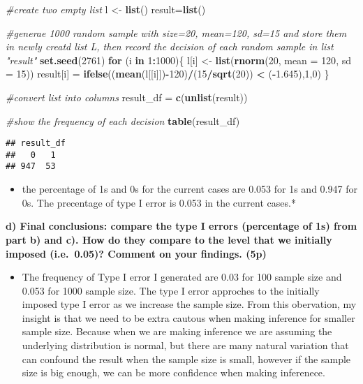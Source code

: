 \documentclass[]{article}
\newenvironment{Shaded}{\begin{snugshade}}{\end{snugshade}}
\newcommand{\CommentTok}[1]{\textcolor[rgb]{0.56,0.35,0.01}{\textit{#1}}}
\newcommand{\ControlFlowTok}[1]{\textcolor[rgb]{0.13,0.29,0.53}{\textbf{#1}}}
\newcommand{\DataTypeTok}[1]{\textcolor[rgb]{0.13,0.29,0.53}{#1}}
\newcommand{\DecValTok}[1]{\textcolor[rgb]{0.00,0.00,0.81}{#1}}
\newcommand{\FloatTok}[1]{\textcolor[rgb]{0.00,0.00,0.81}{#1}}
\newcommand{\KeywordTok}[1]{\textcolor[rgb]{0.13,0.29,0.53}{\textbf{#1}}}
\newcommand{\NormalTok}[1]{#1}
\newcommand{\OperatorTok}[1]{\textcolor[rgb]{0.81,0.36,0.00}{\textbf{#1}}}
\newcommand{\StringTok}[1]{\textcolor[rgb]{0.31,0.60,0.02}{#1}}
\providecommand{\tightlist}{%
  \setlength{\itemsep}{0pt}\setlength{\parskip}{0pt}}
\begin{document}
\begin{Shaded}
\begin{Highlighting}[]
\CommentTok{#create two empty list}
\NormalTok{  l <-}\StringTok{ }\KeywordTok{list}\NormalTok{()}
\NormalTok{result=}\KeywordTok{list}\NormalTok{()}

\CommentTok{#generae 1000 random sample with size=20, mean=120, sd=15 and store them in newly creatd list L, then record the decision of each random sample in list "result"}
\KeywordTok{set.seed}\NormalTok{(}\DecValTok{2761}\NormalTok{)}
\ControlFlowTok{for}\NormalTok{ (i }\ControlFlowTok{in} \DecValTok{1}\OperatorTok{:}\DecValTok{1000}\NormalTok{)\{}
\NormalTok{l[i] <-}\StringTok{ }\KeywordTok{list}\NormalTok{(}\KeywordTok{rnorm}\NormalTok{(}\DecValTok{20}\NormalTok{, }\DataTypeTok{mean =} \DecValTok{120}\NormalTok{, }\DataTypeTok{sd =} \DecValTok{15}\NormalTok{))}
\NormalTok{result[i] =}\StringTok{ }\KeywordTok{ifelse}\NormalTok{((}\KeywordTok{mean}\NormalTok{(l[[i]])}\OperatorTok{-}\DecValTok{120}\NormalTok{)}\OperatorTok{/}\NormalTok{(}\DecValTok{15}\OperatorTok{/}\KeywordTok{sqrt}\NormalTok{(}\DecValTok{20}\NormalTok{)) }\OperatorTok{<}\StringTok{ }\NormalTok{(}\OperatorTok{-}\FloatTok{1.645}\NormalTok{),}\DecValTok{1}\NormalTok{,}\DecValTok{0}\NormalTok{)}
\NormalTok{\}}

\CommentTok{#convert list into columns}
\NormalTok{result_df =}\StringTok{ }\KeywordTok{c}\NormalTok{(}\KeywordTok{unlist}\NormalTok{(result))}

\CommentTok{#show the frequency of each decision}
\KeywordTok{table}\NormalTok{(result_df)}
\end{Highlighting}
\end{Shaded}

\begin{verbatim}
## result_df
##   0   1 
## 947  53
\end{verbatim}

\begin{itemize}
\tightlist
\item
  the percentage of 1s and 0s for the current cases are 0.053 for 1s and
  0.947 for 0s. The precentage of type I error is 0.053 in the current
  cases.*
\end{itemize}

\textbf{d) Final conclusions: compare the type I errors (percentage of
1s) from part b) and c). How do they compare to the level that we
initially imposed (i.e.~0.05)? Comment on your findings. (5p)}

\begin{itemize}
\tightlist
\item
  The frequency of Type I error I generated are 0.03 for 100 sample size
  and 0.053 for 1000 sample size. The type I error approches to the
  initially imposed type I error as we increase the sample size. From
  this obervation, my insight is that we need to be extra cautous when
  making inference for smaller sample size. Because when we are making
  inference we are assuming the underlying distribution is normal, but
  there are many natural variation that can confound the result when the
  sample size is small, however if the sample size is big enough, we can
  be more confidence when making inferenece.
\end{itemize}
\end{document}
